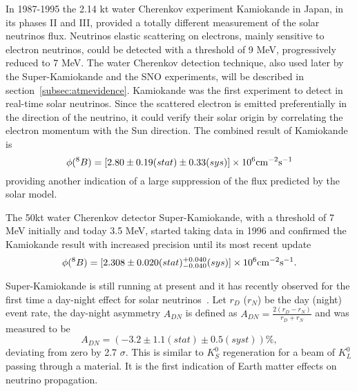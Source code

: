 In 1987-1995 the 2.14 kt water Cherenkov experiment Kamiokande in Japan, in its phases II and III, provided a totally different measurement of the solar neutrinos flux. Neutrinos elastic scattering on electrons, mainly sensitive to electron neutrinos, could be detected with a threshold of 9 MeV, progressively reduced to 7 MeV.  
The water Cherenkov detection technique, also used later by the Super-Kamiokande and the SNO experiments, will be described in section~\ref{subsec:atmevidence}.   
Kamiokande was the first experiment to detect in real-time solar neutrinos. Since the scattered electron is emitted preferentially in the direction of the neutrino, it could verify their solar origin by correlating the electron momentum with the Sun direction. The combined result of Kamiokande~\cite{fukuda} is
\begin{equation}
\phi( ^8 B) = [2.80 \pm 0.19 (stat) \pm 0.33 (sys)] \times 10^6 {\rm cm^{-2} s^{-1}}
\end{equation}
providing another indication of a large suppression of the flux predicted by the solar model.

The 50kt water Cherenkov detector Super-Kamiokande, with a threshold of 7 MeV initially and today 3.5 MeV, started taking data in 1996 and confirmed the Kamiokande result with increased precision until its most recent update~\cite{abesk4}
\begin{equation}
\phi( ^8 B) = [2.308 \pm 0.020 (stat) ^{+0.040}_{-0.040} (sys)] \times 10^6 {\rm cm^{-2} s^{-1}}.
\end{equation} 

Super-Kamiokande is still running at present and it has recently observed for the first time a day-night effect for solar neutrinos~\cite{renshaw}. 
Let $r_D$ ($r_N$) be the day (night) event rate,
the day-night asymmetry $A_{DN}$ is defined as $A_{DN} = \frac{2 (r_D - r_N) }{r_D + r_N}$ and was measured to be
\begin{equation}
A_{DN} = (-3.2 \pm 1.1 (stat) \pm 0.5 (syst)) \%,
\end{equation} 
deviating from zero by 2.7 $\sigma$.
This is similar to $K_S^0$ regeneration for a beam of $K_L^0$ passing through a material. It is the first indication of Earth matter effects on neutrino propagation. 



